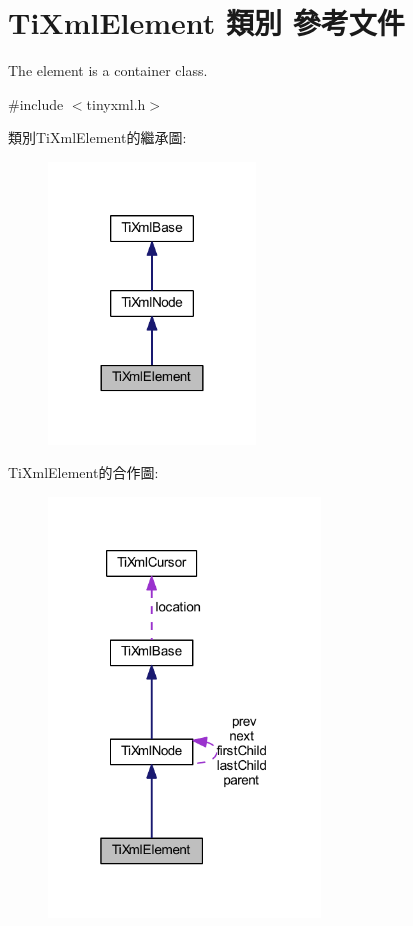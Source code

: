 \hypertarget{class_ti_xml_element}{}\section{Ti\+Xml\+Element 類別 參考文件}
\label{class_ti_xml_element}


The element is a container class.  




{\ttfamily \#include $<$tinyxml.\+h$>$}



類別\+Ti\+Xml\+Element的繼承圖\+:\nopagebreak
\begin{figure}[H]
\begin{center}
\leavevmode
\includegraphics[width=156pt]{class_ti_xml_element__inherit__graph}
\end{center}
\end{figure}


Ti\+Xml\+Element的合作圖\+:\nopagebreak
\begin{figure}[H]
\begin{center}
\leavevmode
\includegraphics[width=205pt]{class_ti_xml_element__coll__graph}
\end{center}
\end{figure}
